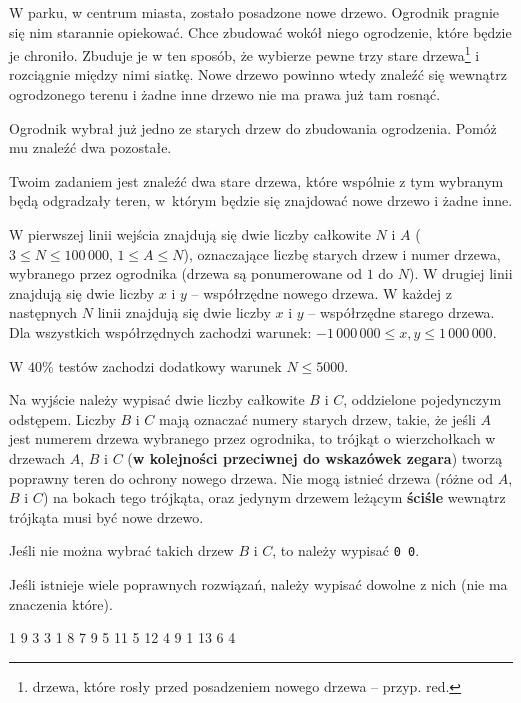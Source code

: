

\usepackage[utf8]{inputenc}
\usepackage[T1]{fontenc}
\usepackage[polish]{babel}
\usepackage{polski}





W parku, w centrum miasta, zostało posadzone nowe drzewo.
Ogrodnik pragnie się nim starannie opiekować.
Chce zbudować wokół niego ogrodzenie, które będzie je chroniło.
Zbuduje je w ten sposób, że wybierze pewne
	trzy stare drzewa\footnote{drzewa, które rosły przed posadzeniem nowego drzewa -- przyp. red.}
	i rozciągnie między nimi siatkę.
Nowe drzewo powinno wtedy znaleźć się wewnątrz ogrodzonego terenu
	i żadne inne drzewo nie ma prawa już tam rosnąć.

Ogrodnik wybrał już jedno ze starych drzew do zbudowania ogrodzenia.
Pomóż mu znaleźć dwa pozostałe.


Twoim zadaniem jest znaleźć dwa stare drzewa, które wspólnie z tym wybranym będą odgradzały teren,
	w~którym będzie się znajdować nowe drzewo i żadne inne.


W pierwszej linii wejścia znajdują się dwie liczby całkowite $N$ i $A$ ($3 \le N \le 100\,000$, $1 \le A \le N$),
	oznaczające liczbę starych drzew i numer drzewa, wybranego przez ogrodnika (drzewa są ponumerowane od $1$ do $N$).
W drugiej linii znajdują się dwie liczby $x$ i $y$ -- współrzędne nowego drzewa.
W każdej z następnych $N$ linii znajdują się dwie liczby $x$ i $y$ -- współrzędne starego drzewa.
Dla wszystkich współrzędnych zachodzi warunek: $-1\,000\,000 \le x, y \le 1\,000\,000$.

W $40\%$ testów zachodzi dodatkowy warunek $N \le 5000$.


Na wyjście należy wypisać dwie liczby całkowite $B$ i $C$, oddzielone pojedynczym odstępem.
Liczby $B$ i $C$ mają oznaczać numery starych drzew, takie, że jeśli $A$ jest numerem drzewa wybranego przez ogrodnika,
	to trójkąt o wierzchołkach w drzewach $A$, $B$ i $C$ (\textbf{w kolejności przeciwnej do wskazówek zegara})
	tworzą poprawny teren do ochrony nowego drzewa.
Nie mogą istnieć drzewa (różne od $A$, $B$ i $C$) na bokach tego trójkąta,
	oraz jedynym drzewem leżącym \textbf{ściśle} wewnątrz trójkąta musi być nowe drzewo.

Jeśli nie można wybrać takich drzew $B$ i $C$, to należy wypisać \texttt{0 0}.

Jeśli istnieje wiele poprawnych rozwiązań, należy wypisać dowolne z nich (nie ma znaczenia które).


 1
9 3
3 1
8 7
9 5
11 5
12 4
9 1
13 6
 4
\sampleEND


